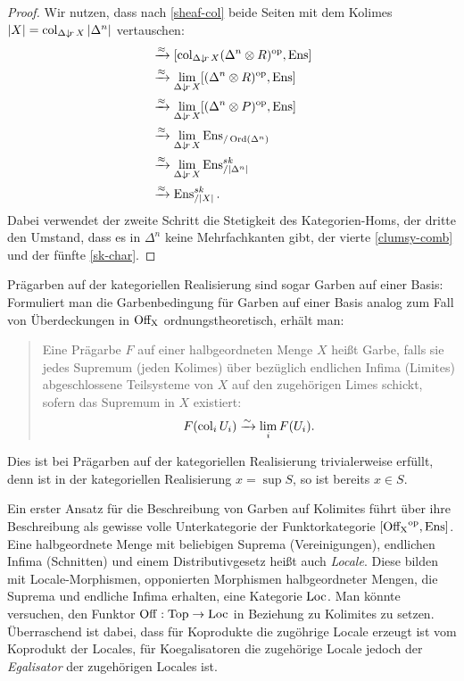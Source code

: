 \begin{proof}
  Wir nutzen, dass nach \ref{sheaf-col} beide Seiten mit dem Kolimes
  $|X| = \operatorname{col}_{\Delta \downarrow \! {\scriptstyle r} \, X} |\Delta^n|$ vertauschen:
  \begin{align*}
    [(X \otimes R)\op, \Ens]
    &\qiso [\col_{\slicecat{\Delta}{r}{X}} (\Delta^n \otimes R)\op, \Ens] \\
    &\qiso \lim_{\slicecat{\Delta}{r}{X}} [(\Delta^n \otimes R)\op, \Ens] \\
    &\qiso \lim_{\slicecat{\Delta}{r}{X}} [(\Delta^n \otimes P)\op, \Ens] \\
    &\qiso \lim_{\slicecat{\Delta}{r}{X}} \Ens_{/\Ord(\Delta^n)} \\
    &\qiso \lim_{\slicecat{\Delta}{r}{X}} \Ens_{/|\Delta^n|}^{sk} \\
    &\qiso \Ens_{/|X|}^{sk}.    
  \end{align*}
  Dabei verwendet der zweite Schritt die Stetigkeit des
  Kategorien-Homs, der dritte den Umstand, dass es in $\Delta^n$ keine
  Mehrfachkanten gibt, der vierte \ref{clumsy-comb} und der fünfte
  \ref{sk-char}.
\end{proof}
\begin{bem}
  Prägarben auf der kategoriellen Realisierung sind sogar Garben auf
  einer Basis: Formuliert man die Garbenbedingung für Garben auf einer
  Basis analog zum Fall von Überdeckungen in $\operatorname{Off_X}$
  ordnungstheoretisch, erhält man:
  \begin{quote}
    Eine Prägarbe $F$ auf einer halbgeordneten Menge $X$ heißt Garbe,
    falls sie jedes Supremum (jeden Kolimes) über bezüglich endlichen
    Infima (Limites) abgeschlossene Teilsysteme von $X$ auf den
    zugehörigen Limes schickt, sofern das Supremum in $X$ existiert:
    \[ F(\operatorname{col}_i U_i) \xrightarrow[]{\sim} \lim_i F(U_i). \]
  \end{quote}
  Dies ist bei Prägarben auf der kategoriellen Realisierung
  trivialerweise erfüllt, denn ist in der kategoriellen Realisierung
  $x = \sup S$, so ist bereits $x \in S$.
\end{bem}

\begin{bem}
  Ein erster Ansatz für die Beschreibung von Garben auf Kolimites
  führt über ihre Beschreibung als gewisse volle Unterkategorie der
  Funktorkategorie $[\operatorname{Off_X}^\mathrm{op}, \operatorname{Ens}]$. Eine halbgeordnete Menge mit
  beliebigen Suprema (Vereinigungen), endlichen Infima (Schnitten) und
  einem Distributivgesetz heißt auch \emph{Locale}. Diese bilden mit
  Locale-Morphismen, opponierten Morphismen halbgeordneter Mengen, die
  Suprema und endliche Infima erhalten, eine Kategorie $\operatorname{Loc}$. Man
  könnte versuchen, den Funktor $\operatorname{Off}: \operatorname{Top} \to \operatorname{Loc}$ in Beziehung zu
  Kolimites zu setzen. Überraschend ist dabei, dass für Koprodukte die
  zugöhrige Locale erzeugt ist vom Koprodukt der Locales, für
  Koegalisatoren die zugehörige Locale jedoch der \emph{Egalisator}
  der zugehörigen Locales ist.
\end{bem}

